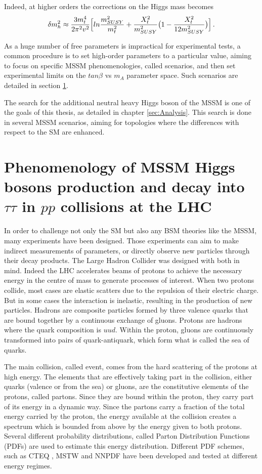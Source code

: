 Indeed, at higher orders the corrections on the Higgs mass becomes \cite{Nagashima:2014tva}
\begin{equation}
    \delta m_h^2 \approx \frac{3 m_t^4}{2\pi^2 v^2} \Big[ ln\frac{m_{SUSY}^2}{m_t^2} + \frac{X_t^2}{m_{SUSY}^2} \big( 1 - \frac{X_t^2}{12 m_{SUSY}^2} \big) \Big] \mend
\end{equation}

As a huge number of free parameters is impractical for experimental tests, a common procedure is to set high-order parameters to a particular value, aiming to focus on specific MSSM phenomenologies, called scenarios, and then set experimental limits on the $tan \beta$ vs $m_A$ parameter space. Such scenarios are detailed in section \ref{sec:pheno}.

The search for the additional neutral heavy Higgs boson of the MSSM is one of the goals of this thesis, as detailed in chapter \ref{sec:Analysis}. This search is done in several MSSM scenarios, aiming for topologies where the differences with respect to the SM are enhanced. 

\section{Phenomenology of MSSM Higgs bosons production and decay into $\tau\tau$ in $pp$ collisions at the LHC}
\label{sec:pheno}

In order to challenge not only the SM but also any BSM theories like the MSSM, many experiments have been designed. Those experiments can aim to make indirect measurements of parameters, or directly observe new particles through their decay products. The Large Hadron Collider was designed with both in mind. Indeed the LHC accelerates beams of protons to achieve the necessary energy in the centre of mass to generate processes of interest. When two protons collide, most cases are elastic scatters due to the repulsion of their electric charge. But in some cases the interaction is inelastic, resulting in the production of new particles. Hadrons are composite particles formed by three valence quarks that are bound together by a continuous exchange of gluons. Protons are hadrons where the quark composition is $uud$. Within the proton, gluons are continuously transformed into pairs of quark-antiquark, which form what is called the sea of quarks.

The main collision, called event, comes from the hard scattering of the protons at high energy. The elements that are effectively taking part in the collision, either quarks (valence or from the sea) or gluons, are the constitutive elements of the protons, called partons. Since they are bound within the proton, they carry part of its energy in a dynamic way. Since the partons carry a fraction of the total energy carried by the proton, the energy available at the collision creates a spectrum which is bounded from above by the energy given to both protons. Several different probability distributions, called Parton Distribution Functions (PDFs) are used to estimate this energy distribution. Different PDF schemes, such as CTEQ \cite{Pumplin:2002vw}, MSTW \cite{Martin:2009iq} and NNPDF \cite{Ball:2008by} have been developed and tested at different energy regimes.

